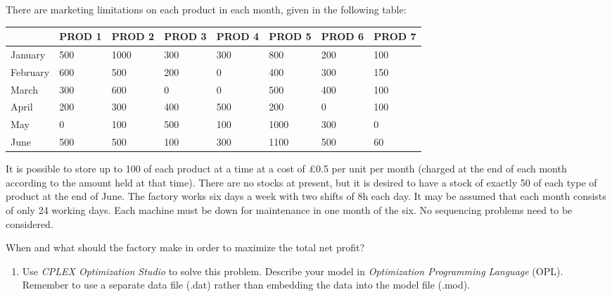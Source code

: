 \documentclass[12pt,a4paper]{article}
\theoremstyle{definition}
\begin{document}
\begin{enumerate}
	There are marketing limitations on each product in each month, given in the following table:
	
	\begin{table}[htbp]
		\scriptsize
		\centering
		\renewcommand\arraystretch{1.1}
		\begin{tabular}{m{} m{}<{\centering} m{}<{\centering} m{}<{\centering} m{}<{\centering} m{}<{\centering} m{}<{\centering} m{}<{\centering}}
			\hline
			& \textbf{PROD 1} & \textbf{PROD 2} & \textbf{PROD 3} & \textbf{PROD 4} & \textbf{PROD 5} & \textbf{PROD 6} &  \textbf{PROD 7} \\\hline
			January & 500 & 1000 & 300 & 300 & 800 & 200 & 100 \\
			February & 600 & 500 & 200 & 0 & 400 & 300 & 150 \\
			March & 300 & 600 & 0 & 0 & 500 & 400 & 100 \\
			April & 200 & 300 & 400 & 500 & 200 & 0 & 100 \\
			May & 0 & 100 & 500 & 100 & 1000 & 300 & 0 \\
			June & 500 & 500 & 100 & 300 & 1100 & 500 & 60 \\
			\hline
		\end{tabular}
	\end{table}
	
	It is possible to store up to 100 of each product at a time at a cost of \pounds0.5 per unit per month (charged at the end of each month according to the amount held at that time). There are no stocks at present, but it is desired to have a stock of exactly 50 of each type of product at the end of June. The factory works six days a week with two shifts of 8h each day. It may be assumed that each month consists of only 24 working days. Each machine must be down for maintenance in one month of the six. No sequencing problems need to be considered.
	
	When and what should the factory make in order to maximize the total net profit?
	
	\begin{enumerate}
		\item
		Use \emph{CPLEX Optimization Studio} to solve this problem. Describe your model in \emph{Optimization Programming Language} (OPL). Remember to use a separate data file (.dat) rather than embedding the data into the model file (.mod).
		

\end{enumerate}
\end{enumerate}
\end{document}
